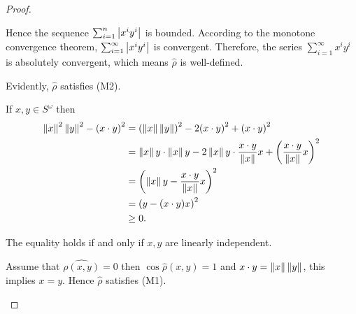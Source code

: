 \begin{proof}
\begin{enumerate}[label={(\alph*)}]
		      Hence the sequence \( \sum_{i=1}^{n} \left\vert{x^{i}y^{i}}\right\vert \) is bounded. According to the monotone convergence theorem, \( \sum_{i=1}^{\infty} \left\vert{x^{i}y^{i}}\right\vert \) is convergent. Therefore, the series \( \sum_{i=1}^{\infty} x^{i}y^{i} \) is absolutely convergent, which means \( \hat{\rho} \) is well-defined.

		      Evidently, \( \hat{\rho} \) satisfies (M2).

		      If \( x, y \in S^{\omega} \) then
		      \begingroup
		      \allowdisplaybreaks%
		      \begin{align*}
			      \left\Vert{x}\right\Vert^{2}\left\Vert{y}\right\Vert^{2} - {(x\cdot y)}^{2} & = {(\left\Vert{x}\right\Vert\left\Vert{y}\right\Vert)}^{2} - 2{(x\cdot y)}^{2} + {(x\cdot y)}^{2}                                                                \\
			                                                  & = \left\Vert{x}\right\Vert y\cdot \left\Vert{x}\right\Vert y - 2 \left\Vert{x}\right\Vert y \cdot \dfrac{x\cdot y}{\left\Vert{x}\right\Vert} x + {\left( \dfrac{x\cdot y}{\left\Vert{x}\right\Vert}x \right)}^{2} \\
			                                                  & = {\left( \left\Vert{x}\right\Vert y - \dfrac{x\cdot y}{\left\Vert{x}\right\Vert}x \right)}^{2}                                                                   \\
			                                                  & = {\left( y - (x\cdot y)x \right)}^{2}                                                                                           \\
			                                                  & \ge 0.
		      \end{align*}
		      \endgroup

		      The equality holds if and only if \( x, y \) are linearly independent.

		      Assume that \( \hat{\rho(x, y)} = 0 \) then \( \cos\hat{\rho}(x, y) = 1 \) and \( x\cdot y = \left\Vert{x}\right\Vert\left\Vert{y}\right\Vert \), this implies \( x = y \). Hence \( \hat{\rho} \) satisfies (M1).


\end{enumerate}
\end{proof}
